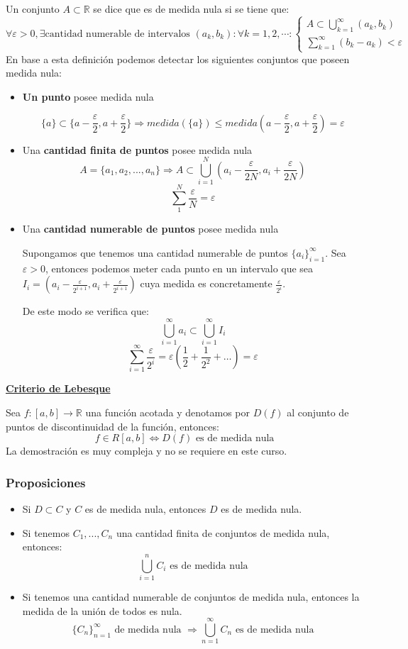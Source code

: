 \documentclass[10pt,a4paper,openright]{book}
\begin{document}
Un conjunto $A\subset \mathbb R$ se dice que es de medida nula si se tiene que:
$$\forall \varepsilon > 0, \exists \mbox{cantidad numerable de intervalos }(a_k,b_k):\forall k = 1,2,\cdots: \begin{cases} A \displaystyle \subset  \displaystyle\bigcup^\infty_{k=1}(a_k,b_k) \\ \displaystyle \sum_{k=1}^{\infty} (b_k - a_k) < \varepsilon\end{cases}$$
En base a esta definición podemos detectar los siguientes conjuntos que poseen medida nula:
\begin{itemize}
\item \textbf{Un punto} posee medida nula

$$\{a\}\subset \{a-\frac{\varepsilon}{2}, a +\frac{\varepsilon}{2}\}\Rightarrow medida(\{a\})\leq medida\left(a-\frac{\varepsilon}{2}, a +\frac{\varepsilon}{2}\right) = \varepsilon$$

\item Una \textbf{cantidad finita de puntos} posee medida nula
$$A = \{a_1, a_2,...,a_n\}\Rightarrow A \subset \bigcup^N_{i=1} \left(a_i - \frac{\varepsilon}{2N}, a_i + \frac{\varepsilon}{2N}\right)$$
$$\sum_{1}^{N} \frac{\varepsilon}{N} = \varepsilon$$

\item Una \textbf{cantidad numerable de puntos} posee medida nula

Supongamos que tenemos una cantidad numerable de puntos $\{a_i\}_{i=1}^\infty$. Sea $\varepsilon >0$, entonces podemos meter cada punto en un intervalo que sea $I_i=\left(a_i-\frac{\varepsilon}{2^{i+1}}, a_i + \frac{\varepsilon}{2^{i+1}}\right)$ cuya medida es concretamente $\frac{\varepsilon}{2^i}$.

De este modo se verifica que:
$$\bigcup^\infty_{i=1} a_i \subset \bigcup^\infty_{i=1} I_i$$
$$\sum_{i=1}^{\infty} \frac{\varepsilon}{2^i} = \varepsilon \left(\frac{1}{2} + \frac{1}{2^2} + \ldots\right) = \varepsilon $$
\end{itemize}
\underline{\textbf{Criterio de Lebesque}}

Sea $f:[a,b]\rightarrow \mathbb R$ una función acotada y denotamos por $D(f)$ al conjunto de puntos de discontinuidad de la función, entonces:
$$f\in R[a,b]\Leftrightarrow D(f) \mbox{ es de medida nula}$$
La demostración es muy compleja y no se requiere en este curso.

\subsubsection*{Proposiciones}
\begin{itemize}
\item Si $D\subset C$ y $C$ es de medida nula, entonces $D$ es de medida nula.
\item Si tenemos $C_1, ..., C_n$ una cantidad finita de conjuntos de medida nula, entonces:
$$\bigcup_{i =1}^{n} C_i\mbox{ es de medida nula}$$
\item Si tenemos una cantidad numerable de conjuntos de medida nula, entonces la medida de la unión de todos es nula.
$$\{C_n\}_{n=1}^\infty\mbox{ de medida nula }\Rightarrow \bigcup_{n=1}^{\infty} C_n \mbox{ es de medida nula}$$
\end{itemize}
\end{document}

